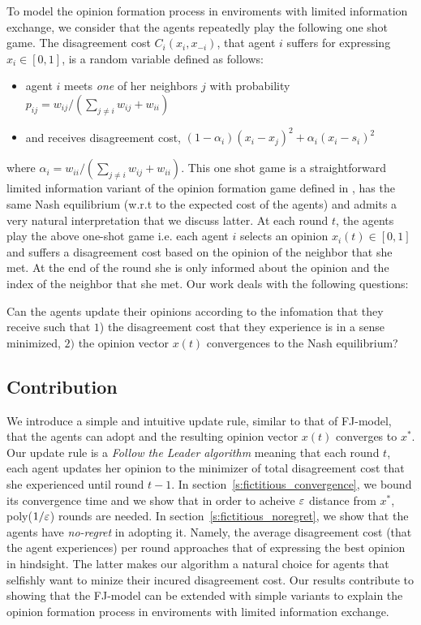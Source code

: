 To model the opinion formation process in enviroments
with limited information exchange, we consider
that the agents repeatedly play the following one shot game.
The disagreement cost $C_i(x_i,x_{-i})$, that
agent $i$ suffers for expressing $x_i \in [0,1]$, is a random variable
defined as follows:
\begin{itemize}
 \item agent $i$ meets \emph{one} of her neighbors $j$ with probability
 $p_{ij}=w_{ij}/(\sum_{j\neq i}w_{ij}+w_{ii})$
 \item and receives disagreement cost, $(1-\alpha_i)(x_i-x_j)^2 + \alpha_i(x_i-s_i)^2$ 
\end{itemize}
where $\alpha_i=w_{ii}/(\sum_{j\neq i}w_{ij}+w_{ii})$. This one shot game
is a straightforward limited information variant of the opinion formation game
defined in \cite{BKO11}, has the same Nash equilibrium (w.r.t 
to the expected cost of the agents) and admits a very 
natural interpretation that we discuss latter.
At each round $t$, the agents play the above one-shot game i.e.
each agent $i$ selects an opinion $x_i(t)\in [0,1]$ and 
suffers a disagreement cost based on the opinion of the neighbor
that she met. At the end of the round she is only informed about
the opinion and the index of the neighbor that she met. Our work
deals with the following questions:
\begin{question}
Can the agents update their opinions according to the 
infomation that they receive such that
$1$) the disagreement cost that they experience is in a
sense minimized, $2)$ the opinion vector $x(t)$ convergences 
to the Nash equilibrium?
\end{question}

\subsection{Contribution}
We introduce a simple and intuitive update rule,
similar to that of FJ-model, that the agents can adopt
and the resulting opinion vector $x(t)$ converges to $x^*$.
Our update rule is a \emph{Follow the Leader algorithm}
meaning that each round $t$, each agent updates her opinion
to the minimizer of total disagreement cost that
she experienced until round $t-1$. In section~\ref{s:fictitious_convergence},
we bound its convergence time and we show that in order
to acheive $\varepsilon$ distance from $x^*$, poly($1/\varepsilon$) rounds 
are needed. In section~\ref{s:fictitious_noregret},
we show that the agents have \emph{no-regret} in adopting
it. Namely, the average disagreement cost (that
the agent experiences) per round approaches that
of expressing the best opinion in hindsight. The latter
makes our algorithm a natural choice for agents that 
selfishly want to minize their incured disagreement cost.
Our results contribute to showing that the FJ-model 
can be extended with simple variants to explain
the opinion formation process in enviroments with limited
information exchange. 

